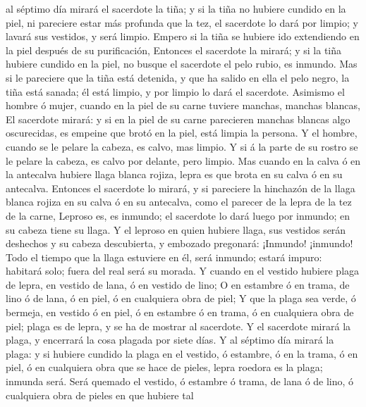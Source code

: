 al séptimo día mirará el sacerdote la tiña; y si la tiña no hubiere
cundido en la piel, ni pareciere estar más profunda que la tez, el
sacerdote lo dará por limpio; y lavará sus vestidos, y será limpio.
 Empero si la tiña se hubiere ido extendiendo en la piel
después de su purificación,  Entonces el sacerdote la
mirará; y si la tiña hubiere cundido en la piel, no busque el sacerdote
el pelo rubio, es inmundo.  Mas si le pareciere que la
tiña está detenida, y que ha salido en ella el pelo negro, la tiña está
sanada; él está limpio, y por limpio lo dará el sacerdote.
 Asimismo el hombre ó mujer, cuando en la piel de su
carne tuviere manchas, manchas blancas,  El sacerdote
mirará: y si en la piel de su carne parecieren manchas blancas algo
oscurecidas, es empeine que brotó en la piel, está limpia la persona.
 Y el hombre, cuando se le pelare la cabeza, es calvo,
mas limpio.  Y si á la parte de su rostro se le pelare la
cabeza, es calvo por delante, pero limpio.  Mas cuando en
la calva ó en la antecalva hubiere llaga blanca rojiza, lepra es que
brota en su calva ó en su antecalva.  Entonces el
sacerdote lo mirará, y si pareciere la hinchazón de la llaga blanca
rojiza en su calva ó en su antecalva, como el parecer de la lepra de la
tez de la carne,  Leproso es, es inmundo; el sacerdote lo
dará luego por inmundo; en su cabeza tiene su llaga.  Y
el leproso en quien hubiere llaga, sus vestidos serán deshechos y su
cabeza descubierta, y embozado pregonará: ¡Inmundo! ¡inmundo!
 Todo el tiempo que la llaga estuviere en él, será
inmundo; estará impuro: habitará solo; fuera del real será su morada.
 Y cuando en el vestido hubiere plaga de lepra, en
vestido de lana, ó en vestido de lino;  O en estambre ó
en trama, de lino ó de lana, ó en piel, ó en cualquiera obra de piel;
 Y que la plaga sea verde, ó bermeja, en vestido ó en
piel, ó en estambre ó en trama, ó en cualquiera obra de piel; plaga es
de lepra, y se ha de mostrar al sacerdote.  Y el
sacerdote mirará la plaga, y encerrará la cosa plagada por siete días.
 Y al séptimo día mirará la plaga: y si hubiere cundido
la plaga en el vestido, ó estambre, ó en la trama, ó en piel, ó en
cualquiera obra que se hace de pieles, lepra roedora es la plaga;
inmunda será.  Será quemado el vestido, ó estambre ó
trama, de lana ó de lino, ó cualquiera obra de pieles en que hubiere tal

